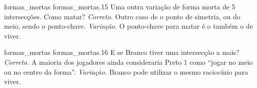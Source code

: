 \problemAnswerDiagram
  {formas_mortas}
  {formas_mortas.15}
  {Uma outra variação de forma morta de 5 intersecções. Como matar?}
  {\emph{Correto.} Outro caso de o ponto de simetria, ou do meio, sendo o ponto-chave.}
  {\emph{Variação.} O ponto-chave para matar é o também o de viver.}

\problemAnswerDiagram
  {formas_mortas}
  {formas_mortas.16}
  {E se Branco tiver uma intersecção a mais?}
  {\emph{Correto.} A maioria dos jogadores ainda consideraria Preto 1 como ``jogar no meio ou no centro da forma''.}
  {\emph{Variação.} Branco pode utilizar o mesmo raciocínio para viver.}
